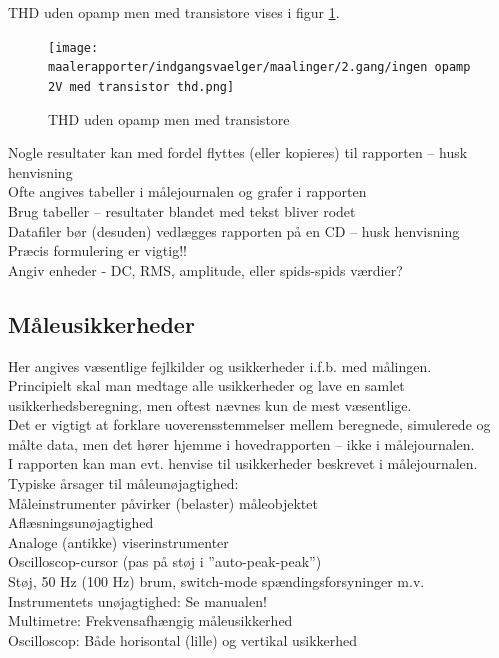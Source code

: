 THD uden opamp men med transistore vises i figur \ref{fig:apind:uopmt}.
\begin{figure}[h]
\centering
\texttt{[image: maalerapporter/indgangsvaelger/maalinger/2.gang/ingen opamp 2V med transistor thd.png]}
\caption{THD uden opamp men med transistore}
\label{fig:apind:uopmt}
\end{figure}



Nogle resultater kan med fordel flyttes (eller kopieres) til rapporten – husk henvisning \\
Ofte angives tabeller i målejournalen og grafer i rapporten \\
Brug tabeller – resultater blandet med tekst bliver rodet\\
Datafiler bør (desuden) vedlægges rapporten på en CD – husk henvisning\\
Præcis formulering er vigtig!!\\
Angiv enheder - DC, RMS, amplitude, eller spids-spids værdier?\\

\subsection*{Måleusikkerheder}
Her angives væsentlige fejlkilder og usikkerheder i.f.b. med målingen. \\
Principielt skal man medtage alle usikkerheder og lave en samlet usikkerhedsberegning, men oftest nævnes kun de mest væsentlige. \\
Det er vigtigt at forklare uoverensstemmelser mellem beregnede, simulerede og målte data, men det hører hjemme i hovedrapporten – ikke i målejournalen. \\
I rapporten kan man evt. henvise til usikkerheder beskrevet i målejournalen.\\
Typiske årsager til måleunøjagtighed:\\
Måleinstrumenter påvirker (belaster) måleobjektet\\
Aflæsningsunøjagtighed\\
Analoge (antikke) viserinstrumenter	\\
Oscilloscop-cursor (pas på støj i ”auto-peak-peak”)\\
Støj, 50 Hz (100 Hz) brum, switch-mode spændingsforsyninger m.v.\\
Instrumentets unøjagtighed: Se manualen! \\
Multimetre: Frekvensafhængig måleusikkerhed \\
Oscilloscop: Både horisontal (lille) og vertikal usikkerhed\\
%
